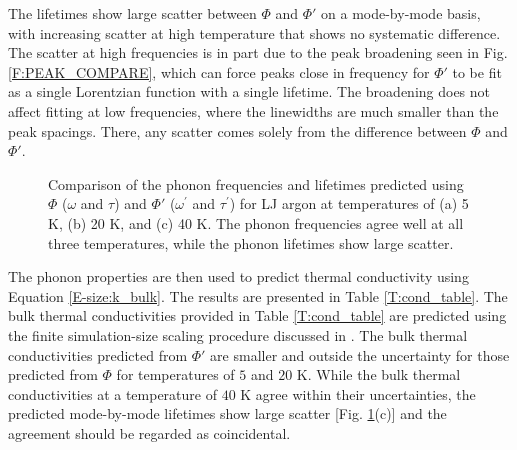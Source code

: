 The lifetimes show large scatter between $\Phi$ and $\Phi'$ on a 
mode-by-mode basis, with increasing 
scatter at high temperature that shows no systematic difference. The 
scatter at high frequencies 
is in part due to the peak broadening seen in Fig$.$ \ref{F:PEAK_COMPARE}, 
which can force peaks 
close in frequency for $\Phi'$ to be fit as a single Lorentzian function 
with a single lifetime. 
The broadening does not affect fitting at low frequencies, where the 
linewidths are much smaller 
than the peak spacings. There, any scatter comes solely from the difference 
between $\Phi$ and $\Phi'$.
\begin{figure}
\begin{center}
\end{center}
\caption{\label{F:FREQ_LIFE_LJ} Comparison of the phonon frequencies and 
lifetimes predicted using 
$\Phi$ ($\omega$ and $\tau$) and $\Phi'$ ($\omega^{'}$ and $\tau^{'}$) for 
LJ argon at temperatures 
of (a) 5 K, (b) 20 K, and (c) 40 K. The phonon frequencies agree well at 
all three temperatures, 
while the phonon lifetimes show large scatter.}
\end{figure}

The phonon properties are then used to predict thermal conductivity using 
Equation 
\eqref{E-size:k_bulk}. The results are presented in Table 
\ref{T:cond_table}. The bulk thermal 
conductivities provided in Table \ref{T:cond_table} are predicted using 
the finite simulation-size 
scaling procedure discussed in \cite{turney_predicting_2009}. The bulk 
thermal conductivities predicted from 
$\Phi'$ are smaller and outside the uncertainty for those predicted from 
$\Phi$ for temperatures of 
$5$ and $20$ K. While the bulk thermal conductivities at a temperature of 
$40$ K agree within their 
uncertainties, the predicted mode-by-mode lifetimes show large scatter 
[Fig$.$ \ref{F:FREQ_LIFE_LJ}(c)] 
and the agreement should be regarded as coincidental.

